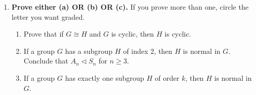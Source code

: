 \documentclass[fleqn,12pt]{article}
\newcommand{\<}{\ensuremath{\langle}}
\renewcommand{\>}{\ensuremath{\rangle}}
\begin{document}
\begin{enumerate}[{\bf 1.}]
\newpage
\item {\bf Prove either (a) OR (b) OR (c).} If you prove more than one, circle the letter you
  want graded.

\begin{enumerate}
\item
Prove that if $G \cong H$ and $G$ is cyclic, then $H$ is cyclic.
\item If a group $G$ has a subgroup $H$ of index 2, then $H$ is
normal in $G$. \\
Conclude that $A_n \triangleleft S_n$ for $n \geq 3$.
\item 
If a group $G$ has exactly one subgroup $H$ of order $k$, then
$H$ is normal in $G$. 

\end{enumerate}




\end{enumerate}
\end{document}
